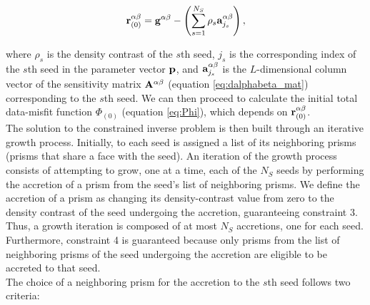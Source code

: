 \begin{equation}
\mathbf{r}_{(0)}^{\alpha\beta} = \mathbf{g}^{\alpha\beta} -
\left(\sum\limits_{s=1}^{N_S} \rho_s \mathbf{a}_{j_s}^{\alpha\beta}\right),
\label{eq:residual_initial}
\end{equation}

\noindent
where $\rho_s$ is the density contrast of the $s$th seed, $j_s$ is the
corresponding index of the $s$th seed in the parameter vector $\mathbf{p}$, and
$\mathbf{a}_{j_s}^{\alpha\beta}$ is the $L$-dimensional column vector of the
sensitivity matrix $\mathbf{A}^{\alpha\beta}$ (equation \ref{eq:dalphabeta_mat})
corresponding to the $s$th seed.
We can then proceed to calculate the initial total data-misfit function
$\Phi_{(0)}$ (equation \ref{eq:Phi}), which depends on
$\mathbf{r}_{(0)}^{\alpha\beta}$.
\\
\indent
The solution to the constrained inverse problem is then built through an
iterative growth process.
Initially, to each seed is assigned a list of its neighboring prisms
(prisms that share a face with the seed).
An iteration of the growth process consists of attempting to grow,
one at a time, each of the $N_S$ seeds by performing the accretion of
a prism from the seed's list of neighboring prisms.
We define the accretion of a prism as changing its density-contrast value from
zero to the density contrast of the seed undergoing the accretion,
guaranteeing constraint 3. 
Thus, a growth iteration is composed of at most $N_S$ accretions,
one for each seed.
Furthermore, constraint 4 is guaranteed because only prisms from the
list of neighboring prisms of the seed undergoing the accretion are eligible to
be accreted to that seed.
\\
\indent
The choice of a neighboring prism for the accretion to the $s$th
seed follows two criteria:

